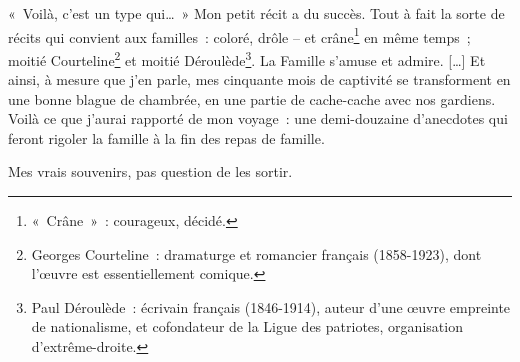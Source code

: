 {«~Voilà, c'est un type qui…~» Mon petit récit a du succès. Tout à fait
la sorte de récits qui convient aux familles~: coloré, drôle – et
crâne\footnote{«~Crâne~»~: courageux, décidé.} en même temps~; moitié
Courteline\footnote{Georges Courteline~: dramaturge et romancier
français (1858-1923), dont l'œuvre est essentiellement comique.} et
moitié Déroulède\footnote{Paul Déroulède~: écrivain français
(1846-1914), auteur d'une œuvre empreinte de nationalisme, et
cofondateur de la Ligue des patriotes, organisation
d'extrême-droite.}. La Famille s'amuse et admire. […] Et ainsi, à
mesure que j'en parle, mes cinquante mois de captivité se
transforment en une bonne blague de chambrée, en une partie de
cache-cache avec nos gardiens. Voilà ce que j'aurai rapporté de mon
voyage~: une demi-douzaine d'anecdotes qui feront rigoler la famille
à la fin des repas de famille.

Mes vrais souvenirs, pas question de les sortir.
}


